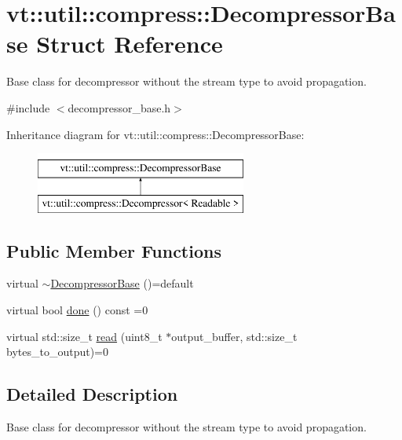 \hypertarget{structvt_1_1util_1_1compress_1_1_decompressor_base}{}\section{vt\+:\+:util\+:\+:compress\+:\+:Decompressor\+Base Struct Reference}
\label{structvt_1_1util_1_1compress_1_1_decompressor_base}


Base class for decompressor without the stream type to avoid propagation.  




{\ttfamily \#include $<$decompressor\+\_\+base.\+h$>$}

Inheritance diagram for vt\+:\+:util\+:\+:compress\+:\+:Decompressor\+Base\+:\begin{figure}[H]
\begin{center}
\leavevmode
\includegraphics[height=2.000000cm]{structvt_1_1util_1_1compress_1_1_decompressor_base}
\end{center}
\end{figure}
\subsection*{Public Member Functions}
\begin{DoxyCompactItemize}
\item 
virtual \hyperlink{structvt_1_1util_1_1compress_1_1_decompressor_base_aa81872201422e0b7a5fed31b0fcb062b}{$\sim$\+Decompressor\+Base} ()=default
\item 
virtual bool \hyperlink{structvt_1_1util_1_1compress_1_1_decompressor_base_ab9c1b966391fe8e83a1ed30d968b606b}{done} () const =0
\item 
virtual std\+::size\+\_\+t \hyperlink{structvt_1_1util_1_1compress_1_1_decompressor_base_ab203ef8c8540beae635abd77d0409df1}{read} (uint8\+\_\+t $\ast$output\+\_\+buffer, std\+::size\+\_\+t bytes\+\_\+to\+\_\+output)=0
\end{DoxyCompactItemize}


\subsection{Detailed Description}
Base class for decompressor without the stream type to avoid propagation. 

